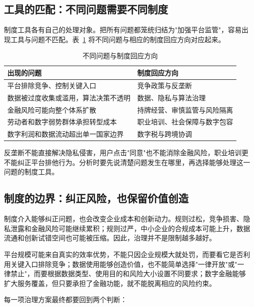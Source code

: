 \subsection{工具的匹配：不同问题需要不同制度}

制度工具各有自己的处理对象。把所有问题都笼统归结为"加强平台监管"，容易出现工具与问题不匹配。表~\ref{tab:trial-governance-tools} 将不同问题与相应的制度回应方向对应起来。

\begin{table}[htbp]
\centering
\setlength{\tabcolsep}{4pt}
\renewcommand{\arraystretch}{1.35}
\caption{不同问题与制度回应方向}
\label{tab:trial-governance-tools}
\begin{tabular}{p{5.2cm}p{7.0cm}}
\hline
\textbf{出现的问题} & \textbf{制度回应方向} \\
\hline
平台排除竞争、控制关键入口 & 竞争政策与反垄断 \\
数据被过度收集或滥用，算法决策不透明 & 数据、隐私与算法治理 \\
金融风险可能向整个体系扩散 & 持牌经营、审慎监管与风险隔离 \\
劳动者和数字弱势群体承担转型成本 & 职业培训、社会保障与数字包容 \\
数字利润和数据流动超出单一国家边界 & 数字税与跨境协调 \\
\hline
\end{tabular}
\end{table}

反垄断不能直接解决隐私侵害，用户点击"同意"也不能消除金融风险，职业培训更不能纠正平台排他行为。分析时要先说清楚问题发生在哪里，再选择能够处理这一问题的制度工具。

\subsection{制度的边界：纠正风险，也保留价值创造}

制度介入能够纠正问题，也会改变企业成本和创新动力。规则过松，竞争损害、隐私泄露和金融风险可能继续累积；规则过严，中小企业的合规成本可能上升，数据流通和创新试错空间也可能被压缩。因此，治理并不是限制越多越好。

平台规模可能来自真实的效率优势，不能只因企业规模大就处罚，而要看它是否利用关键入口排除竞争；数据使用能够创造价值，也不能简单选择"一律开放"或"一律禁止"，而要根据数据类型、使用目的和风险大小设置不同要求；数字金融能够扩大服务覆盖，但只要承担了金融功能，就不能脱离相应的风险约束。

每一项治理方案最终都要回到两个判断：

\begin{center}
\end{center}
